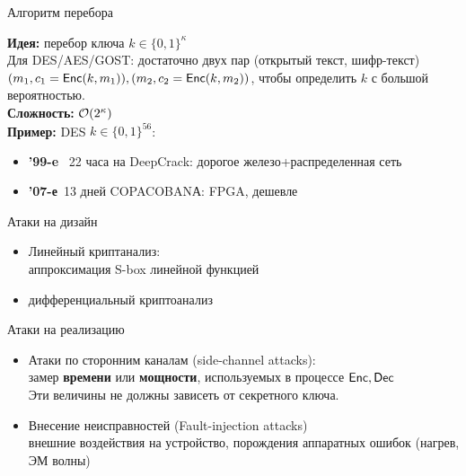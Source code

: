 \documentclass[usenames,dvipsnames,8pt,aspectratio=169]{beamer}
\begin{document}
\begin{frame}{Алгоритм перебора}

\Large
{\color{Orange}\textbf{Идея:}}  перебор ключа $k \in \{0,1\}^{\kappa}$ \\[5pt]

Для DES/AES/GOST:  достаточно двух пар (открытый текст, шифр-текст) $(m_1, c_1 = \textsf{Enc}(k, m_1)), (m_2, c_2=\textsf{Enc}(k,m_2))$, чтобы определить $k$ с большой вероятностью.\\[10pt]

{\color{Orange}\textbf{Сложность:}} $\mathcal{O}(2^{\kappa})$ \\[10pt]

{\color{Orange}\textbf{Пример:}}  DES $k \in \{0,1\}^{56}$:

\begin{itemize}
\item {\color{Orange}\textbf{'99-e}} ~22 часа на DeepCrack: дорогое железо+распределенная сеть
\item {\color{Orange}\textbf{'07-е}}~13 дней COPACOBANА: FPGA, дешевле
\end{itemize}
\end{frame}


\begin{frame}{Атаки на дизайн }
\LARGE
\begin{itemize}
	\itemsep 1em
	\item Линейный криптанализ:  \\[2pt]
	аппроксимация S-box линейной функцией
	
	\item дифференциальный криптоанализ \\[5pt]
\end{itemize}
\end{frame}


\begin{frame}{Атаки на реализацию}
\LARGE
\begin{itemize}
\itemsep 1em
\item Атаки по сторонним каналам (side-channel attacks): \\[2pt]
замер {\color{Orange}\textbf{времени}} или {\color{Orange}\textbf{мощности}}, используемых в процессе $\textsf{Enc}, \textsf{Dec}$   \\[5pt]
Эти величины не должны зависеть от секретного ключа.

\item Внесение неисправностей (Fault-injection attacks)  \\[5pt]
внешние воздействия на устройство, порождения аппаратных ошибок (нагрев, ЭМ волны)
\end{itemize}
\end{frame}
\end{document}
